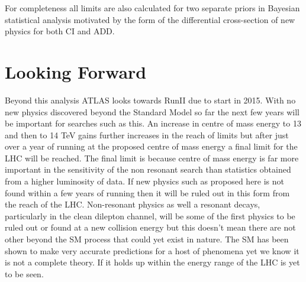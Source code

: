 For completeness all limits are also calculated for two separate priors in Bayesian statistical analysis motivated by the form of the differential cross-section of new physics for both CI and ADD.


\section{Looking Forward}

Beyond this analysis ATLAS looks towards RunII due to start in 2015. With no new physics discovered beyond the Standard Model so far the next few years will be important for searches such as this. An increase in centre of mass energy to 13 and then to 14 TeV gains further increases in the reach of limits but after just over a year of running at the proposed centre of mass energy a final limit for the LHC will be reached. The final limit is because centre of mass energy is far more important in the sensitivity of the non resonant search than statistics obtained from a higher luminosity of data. If new physics such as proposed here is not found within a few years of running then it will be ruled out in this form from the reach of the LHC. Non-resonant physics as well a resonant decays, particularly in the clean dilepton channel, will be some of the first physics to be ruled out or found at a new collision energy but this doesn't mean there are not other beyond the SM process that could yet exist in nature. The SM has been shown to make very accurate predictions for a host of phenomena yet we know it is not a complete theory. If it holds up within the energy range of the LHC is yet to be seen. 





